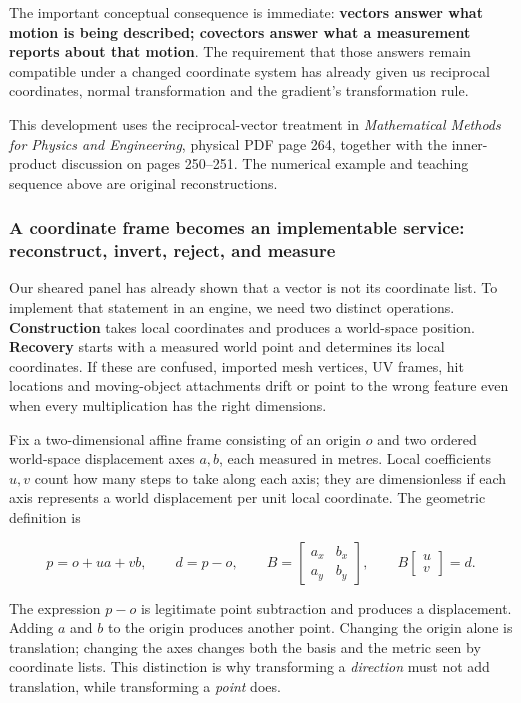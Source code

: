 The important conceptual consequence is immediate: \textbf{vectors answer what motion is being described; covectors answer what a measurement reports about that motion}. The requirement that those answers remain compatible under a changed coordinate system has already given us reciprocal coordinates, normal transformation and the gradient's transformation rule.

This development uses the reciprocal-vector treatment in \emph{Mathematical Methods for Physics and Engineering}, physical PDF page 264, together with the inner-product discussion on pages 250--251. The numerical example and teaching sequence above are original reconstructions.

\subsubsection{A coordinate frame becomes an implementable service: reconstruct, invert, reject, and measure}\label{a-coordinate-frame-becomes-an-implementable-service-reconstruct-invert-reject-and-measure}

Our sheared panel has already shown that a vector is not its coordinate list. To implement that statement in an engine, we need two distinct operations. \textbf{Construction} takes local coordinates and produces a world-space position. \textbf{Recovery} starts with a measured world point and determines its local coordinates. If these are confused, imported mesh vertices, UV frames, hit locations and moving-object attachments drift or point to the wrong feature even when every multiplication has the right dimensions.

Fix a two-dimensional affine frame consisting of an origin \(o\) and two ordered world-space displacement axes \(a,b\), each measured in metres. Local coefficients \(u,v\) count how many steps to take along each axis; they are dimensionless if each axis represents a world displacement per unit local coordinate. The geometric definition is

\[
p=o+ua+vb,\qquad d=p-o,\qquad
B=\begin{bmatrix}a_x&b_x\\a_y&b_y\end{bmatrix},\qquad
B\begin{bmatrix}u\\v\end{bmatrix}=d.
\]

The expression \(p-o\) is legitimate point subtraction and produces a displacement. Adding \(a\) and \(b\) to the origin produces another point. Changing the origin alone is translation; changing the axes changes both the basis and the metric seen by coordinate lists. This distinction is why transforming a \emph{direction} must not add translation, while transforming a \emph{point} does.

